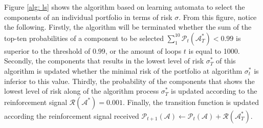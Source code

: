 Figure \ref{alg: ls} shows the algorithm based on learning automata to select the components of an individual portfolio in terms of risk $\sigma$. From this figure, notice the following. Firstly, the algorithm will be terminated whether the sum of the top-ten probabilities of a component to be selected $\sum_1^{10}{\mathcal{P}_t(\mathcal{A}^*_T)}<0.99$ is superior to the threshold of $0.99$, or the amount of loops $t$ is equal to 1000. Secondly, the components that results in the lowest level of risk $\sigma^*_T$ of this algorithm is updated whether the minimal risk of the portfolio at algorithm $\sigma^*_t$ is inferior to this value. Thirdly, the probability of the components that shows the lowest level of risk along of the algorithm process $\sigma^*_T$ is updated according to the reinforcement signal $\mathcal{R}(\mathcal{A}^*)=0.001$. Finally, the transition function is updated according the reinforcement signal received $\mathcal{P}_{t+1}(\mathcal{A}) \gets \mathcal{P}_t(\mathcal{A}) + \mathcal{R}(\mathcal{A}^*_T)$.